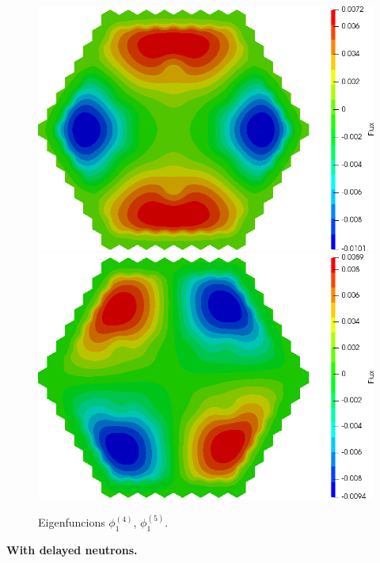 \documentclass[authoryear]{elsarticle}
\begin{document}
\begin{figure}[h]
\begin{center}
	\includegraphics[width=0.49\linewidth]{iaea_with/alpha_sp3_u1_4.png}
	\includegraphics[width=0.49\linewidth]{iaea_with/alpha_sp3_u1_5.png}\\
	\caption{Eigenfuncions $\phi_1^{(4)}$, $\phi_1^{(5)}$.}
	\label{fig:iaea_with_fun_3}
\end{center}
\end{figure}

\textbf{With delayed neutrons.}

\end{document}
